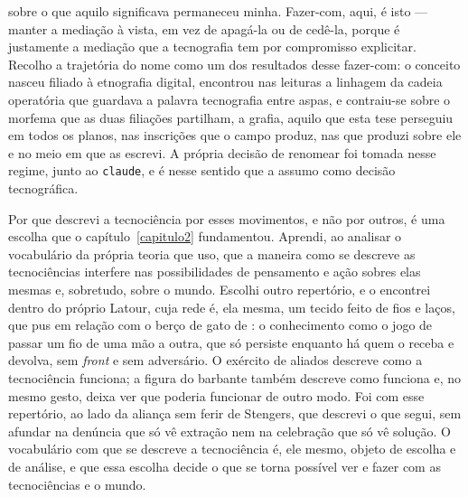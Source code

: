 sobre o que aquilo significava permaneceu minha. Fazer-com, aqui, é isto --- manter a mediação à vista, em vez de apagá-la ou de cedê-la, porque é justamente a mediação que a tecnografia tem por compromisso explicitar. Recolho a trajetória do nome como um dos resultados desse fazer-com: o conceito nasceu filiado à etnografia digital, encontrou nas leituras a linhagem da cadeia operatória que guardava a palavra tecnografia entre aspas, e contraiu-se sobre o morfema que as duas filiações partilham, a grafia, aquilo que esta tese perseguiu em todos os planos, nas inscrições que o campo produz, nas que produzi sobre ele e no meio em que as escrevi. A própria decisão de renomear foi tomada nesse regime, junto ao \texttt{claude}, e é nesse sentido que a assumo como decisão tecnográfica.

Por que descrevi a tecnociência por esses movimentos, e não por outros, é uma escolha que o capítulo~\ref{capitulo2} fundamentou. Aprendi, ao analisar o vocabulário da própria teoria que uso, que a maneira como se descreve as tecnociências interfere nas possibilidades de pensamento e ação sobres elas mesmas e, sobretudo, sobre o mundo. Escolhi outro repertório, e o encontrei dentro do próprio Latour, cuja rede é, ela mesma, um tecido feito de fios e laços, que pus em relação com o berço de gato de \textcite{Haraway2023Ficar}: o conhecimento como o jogo de passar um fio de uma mão a outra, que só persiste enquanto há quem o receba e devolva, sem \textit{front} e sem adversário. O exército de aliados descreve como a tecnociência funciona; a figura do barbante também descreve como funciona e, no mesmo gesto, deixa ver que poderia funcionar de outro modo. Foi com esse repertório, ao lado da aliança sem ferir de Stengers, que descrevi o que segui, sem afundar na denúncia que só vê extração nem na celebração que só vê solução. O vocabulário com que se descreve a tecnociência é, ele mesmo, objeto de escolha e de análise, e que essa escolha decide o que se torna possível ver e fazer com as tecnociências e o mundo. 

